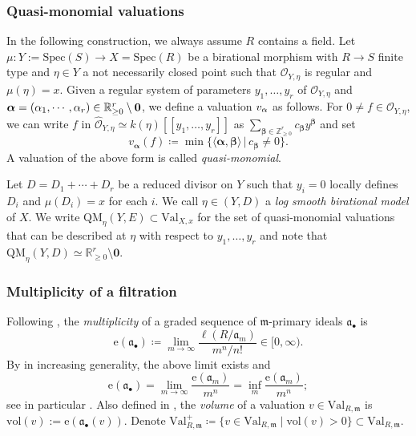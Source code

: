 \documentclass[11pt, leqno]{amsart}%
\theoremstyle{plain}
\theoremstyle{definition}
\theoremstyle{remark}
\newcommand{\cO}{\mathcal{O}}
\newcommand{\bR}{\mathbb{R}}
\newcommand{\bZ}{\mathbb{Z}}
\newcommand{\fa}{\mathfrak{a}}
\newcommand{\fm}{\mathfrak{m}}
\newcommand{\vol}{\mathrm{vol}}
\newcommand{\Val}{\mathrm{Val}}
\newcommand{\Spec}{\mathrm{Spec}}
\newcommand{\QM}{\mathrm{QM}}
\newcommand{\e}{\mathrm{e}}
\numberwithin{equation}{section}
\begin{document}
\subsubsection{Quasi-monomial valuations}\label{sssec:QM}
In the following construction, we always assume $R$ contains a field. Let $\mu\colon Y:= \Spec(S) \to X=\Spec(R)$ be a birational morphism
with $R\to S$  finite type
and $\eta\in Y$  a not necessarily closed point such that $\cO_{Y,\eta}$ is regular and $\mu(\eta) =x$.
Given a  regular system of parameters $y_1,\ldots, y_r$ of $\cO_{Y,\eta}$
and $\bm{\alpha}=(\alpha_1,\cdots, \alpha_r)\in \bR_{\geq 0}^r\setminus {\bf 0}$, we define a valuation $v_{\bf \alpha}$ as follows. 
For $0\neq f\in \cO_{Y,\eta}$, we can write $f$ in $\widehat{\cO}_{Y,\eta} \simeq k(\eta) [[y_1,\ldots, y_r]]$ as
$\sum_{\bm{\beta}\in \bZ_{\geq 0}^r} c_{\bm{\beta}} {y}^{\bm{\beta}}$ and set 
\[
v_{\bm \alpha}(f)\coloneqq \min \{ \langle \bm{\alpha}, {\bm \beta} \rangle \, \vert \, c_{\bm \beta} \neq 0 \}.
\]
A valuation of the above form is called \emph{quasi-monomial}. 




Let $D= D_{1}+\cdots +D_r$ be a reduced divisor on $Y$ such that $y_i=0$ locally defines $D_i$ and $\mu(D_i)= x$ for each $i$. 
We call $\eta\in (Y,D)$ a \emph{log smooth birational model} of $X$. 
We write $\QM_\eta(Y,E)  \subset \Val_{X,x}$ for the set of quasi-monomial valuations that can be described at 
$\eta$ with respect to $y_1,\ldots, y_r$ and note that $\QM_\eta (Y,D) \simeq \bR^r_{\geq 0} \setminus \bm{0}$.



\subsubsection{Multiplicity of a filtration}\label{sssec:mult}

Following \cite{ELS03}, the \emph{multiplicity} of a graded sequence of $\fm$-primary ideals $\fa_\bullet$ is
\[
    \e(\fa_\bullet)\coloneqq \lim_{m\to\infty}\frac{\ell(R/\fa_m)}{m^n/n!} \in [0,\infty).
\]
By  \cites{ELS03,Mus02,LM09,Cut13,Cut14} in increasing generality, the above limit exists and
\begin{equation}\label{eqn:vol=mult}
    \e(\fa_\bullet)=\lim_{m\to\infty}\frac{\e(\fa_m)}{m^n} = \inf_{m} \frac{\e(\fa_m)}{m^n};
\end{equation}
see in particular \cite[Theorem 6.5]{Cut14}.
Also defined in \cite{ELS03}, the \emph{volume} of a valuation $v\in \Val_{R,\fm}$ is $\vol(v):= \e(\fa_\bullet(v))$.
Denote $\Val_{R,\fm}^+\coloneqq \{v\in\Val_{R,\fm}\mid \vol(v)>0\}\subset \Val_{R,\fm}$.
\end{document}
